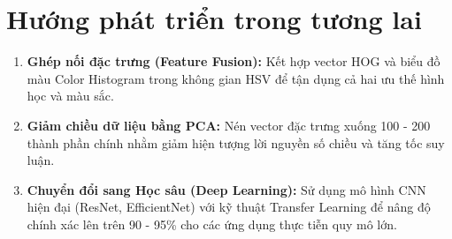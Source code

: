 \documentclass[../DoAn.tex]{subfiles}
\begin{document}
\section{Hướng phát triển trong tương lai}
\begin{enumerate}
    \item \textbf{Ghép nối đặc trưng (Feature Fusion):} Kết hợp vector HOG và biểu đồ màu Color Histogram trong không gian HSV để tận dụng cả hai ưu thế hình học và màu sắc.
    \item \textbf{Giảm chiều dữ liệu bằng PCA:} Nén vector đặc trưng xuống 100 - 200 thành phần chính nhằm giảm hiện tượng lời nguyền số chiều và tăng tốc suy luận.
    \item \textbf{Chuyển đổi sang Học sâu (Deep Learning):} Sử dụng mô hình CNN hiện đại (ResNet, EfficientNet) với kỹ thuật Transfer Learning để nâng độ chính xác lên trên 90 - 95\% cho các ứng dụng thực tiễn quy mô lớn.
\end{enumerate}
\end{document}
